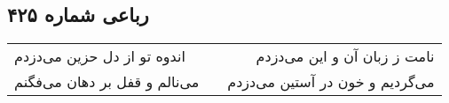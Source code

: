 \begin{center}
\section*{رباعی شماره ۴۲۵}
\label{sec:sh425}
\begin{longtable}{l p{0.5cm} r}
اندوه تو از دل حزین می‌دزدم
&&
نامت ز زبان آن و این می‌دزدم
\\
می‌نالم و قفل بر دهان می‌فگنم
&&
می‌گردیم و خون در آستین می‌دزدم
\\
\end{longtable}
\end{center}
